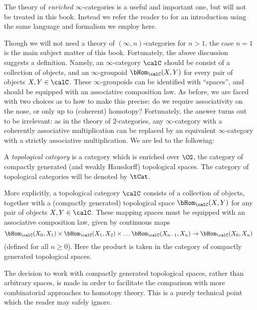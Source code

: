\begin{itemize}
The theory of {\em enriched} $\infty$-categories is a useful and important one, but will not be treated in this book. Instead we refer the reader to \cite{DAG} for an introduction using the same language and formalism we employ here. 
\end{itemize}

Though we will not need a theory of $(\infty,n)$-categories for $n > 1$, the case $n=1$ is the main subject matter of this book. Fortunately, the above discussion suggests a definition. Namely, an $\infty$-category $\calC$ should be consist of a collection of objects, and an $\infty$-groupoid 
$\bHom_{\calC}(X,Y)$ for every pair of objects $X,Y \in \calC$. These $\infty$-groupoids can be identified with ``spaces'', and should be equipped with an associative composition law.
As before, we are faced with two choices as to how to make this
precise: do we require associativity on the nose, or only up to (coherent)
homotopy? Fortunately, the answer turns out to be irrelevant:
as in the theory of $2$-categories, any $\infty$-category
with a coherently associative multiplication can be replaced by an
equivalent $\infty$-category with a strictly associative
multiplication. We are led to the following:

\begin{definition}\label{ic}
A {\it topological category} is a category which is enriched over
$\CG$, the category of compactly generated (and weakly Hausdorff) topological
spaces. The category of topological categories will be denoted by
$\tCat$.
\end{definition}

More explicitly, a topological category $\calC$ consists of a
collection of objects, together with a (compactly generated)
topological space $\bHom_{\calC}(X,Y)$ for any pair of objects $X,Y
\in \calC$. These mapping spaces must be equipped with an
associative composition law, given by continuous maps
$$\bHom_{\calC}(X_0, X_1) \times \bHom_{\calC}(X_1, X_2) \times
\ldots \bHom_{\calC}(X_{n-1},X_n) \rightarrow
\bHom_{\calC}(X_0,X_n)$$ (defined for all $n \geq 0$). Here the
product is taken in the category of compactly generated
topological spaces.

\begin{remark}
The decision to work with compactly generated topological spaces,
rather than arbitrary spaces, is made in order to facilitate the comparison with more
combinatorial approaches to homotopy theory. This is a purely
technical point which the reader may safely ignore.
\end{remark}

